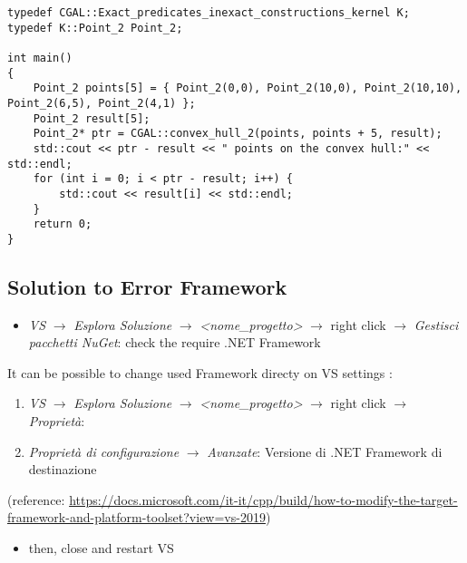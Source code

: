 \documentclass[11pt, english, openany]{report}
\begin{document}
\begin{appendices}
\begin{lstlisting}
typedef CGAL::Exact_predicates_inexact_constructions_kernel K;
typedef K::Point_2 Point_2;
    
int main()
{
	Point_2 points[5] = { Point_2(0,0), Point_2(10,0), Point_2(10,10), Point_2(6,5), Point_2(4,1) };
	Point_2 result[5];
	Point_2* ptr = CGAL::convex_hull_2(points, points + 5, result);
	std::cout << ptr - result << " points on the convex hull:" << std::endl;
	for (int i = 0; i < ptr - result; i++) {
		std::cout << result[i] << std::endl;
	}
	return 0;
}
\end{lstlisting}

\subsection{Solution to Error Framework}
\begin{itemize}
\item \textit{VS} $\rightarrow$ \textit{Esplora Soluzione} $\rightarrow$ \textit{<nome\_progetto>} $\rightarrow$ right click $\rightarrow$ \textit{Gestisci pacchetti NuGet}: check the require .NET Framework
\end{itemize}
It can be possible to change used Framework directy on VS settings :
\begin{enumerate}
\item \textit{VS} $\rightarrow$ \textit{Esplora Soluzione} $\rightarrow$ \textit{<nome\_progetto>} $\rightarrow$ right click $\rightarrow$ \textit{Proprietà}:
\item \textit{Proprietà di configurazione} $\rightarrow$ \textit{Avanzate}: Versione di .NET Framework di destinazione
\end{enumerate}
(reference: \href{https://docs.microsoft.com/it-it/cpp/build/how-to-modify-the-target-framework-and-platform-toolset?view=vs-2019}{https://docs.microsoft.com/it-it/cpp/build/how-to-modify-the-target-framework-and-platform-toolset?view=vs-2019})
\begin{itemize}
\item then, close and restart VS
\end{itemize}


\end{appendices}
\end{document}
